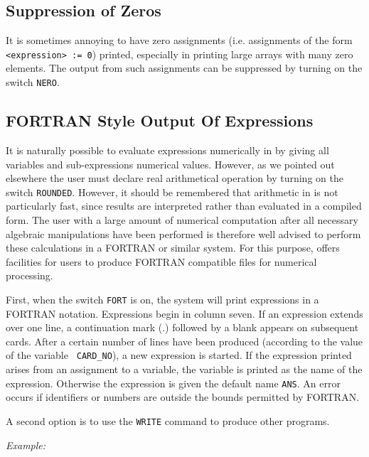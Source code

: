 \subsection{Suppression of Zeros}
\hypertarget{switch:NERO}{}

It is sometimes annoying to have zero assignments (i.e. assignments of the
form {\tt <expression> := 0}) printed, especially in printing large arrays
with many zero elements.  The output from such assignments can be
suppressed by turning on the switch {\tt NERO}.

\subsection{{FORTRAN} Style Output Of Expressions}

It is naturally possible to evaluate expressions numerically in {\REDUCE} by
giving all variables and sub-expressions numerical values. However, as we
pointed out elsewhere the user must declare real arithmetical operation by
turning on the switch {\tt ROUNDED}.  However, it should be
remembered that arithmetic in {\REDUCE} is not particularly fast, since
results are interpreted rather than evaluated in a compiled form. The user
with a large amount of numerical computation after all necessary algebraic
manipulations have been performed is therefore well advised to perform
these calculations in a FORTRAN or similar system.  For
this purpose, {\REDUCE} offers facilities for users to produce FORTRAN
compatible files for numerical processing.

\hypertarget{reserved:CARD_NO}{}
\hypertarget{switch:FORT}{}
First, when the switch {\tt FORT} is on, the system will
print expressions in a FORTRAN notation.  Expressions begin in column
seven.  If an expression extends over one line, a continuation mark (.)
followed by a blank appears on subsequent cards.  After a certain number
of lines have been produced (according to the value of the variable {\tt
CARD\_NO}), a new expression is started.  If the
expression printed arises from an assignment to a variable, the variable
is printed as the name of the expression.  Otherwise the expression is
given the default name {\tt ANS}.  An error occurs if identifiers or
numbers are outside the bounds permitted by FORTRAN.

A second option is to use the {\tt WRITE} command to produce other programs.

{\it Example:}

